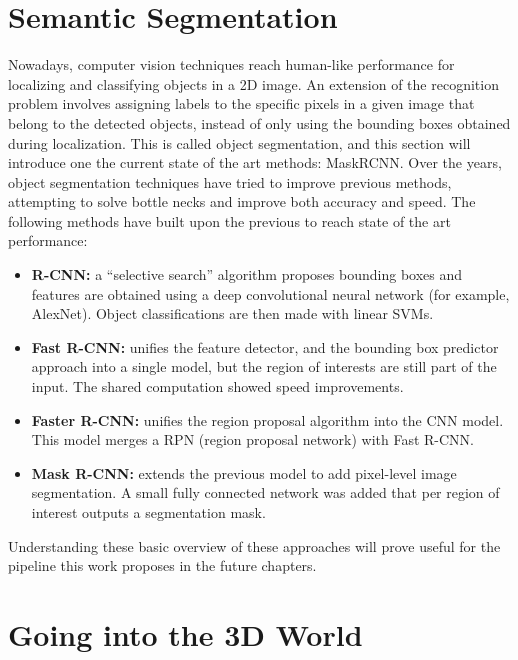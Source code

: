 \section{Semantic Segmentation}\label{chap:2:semantic-segmentation}
Nowadays, computer vision techniques reach human-like performance for localizing and classifying objects in a 2D image. An extension of the recognition problem involves assigning labels to the specific pixels in a given image that belong to the detected objects, instead of only using the bounding boxes obtained during localization. This is called object segmentation, and this section will introduce one the current state of the art methods: MaskRCNN.
Over the years, object segmentation techniques have tried to improve previous methods, attempting to solve bottle necks and improve both accuracy and speed. The following methods have built upon the previous to reach state of the art performance:
\begin{itemize}
    \item \textbf{R-CNN:} a “selective search” algorithm proposes bounding boxes and features are obtained using a deep convolutional neural network (for example, AlexNet). Object classifications are then made with linear SVMs.
    \item \textbf{Fast R-CNN:} unifies the feature detector, and the bounding box predictor approach into a single model, but the region of interests are still part of the input. The shared computation showed speed improvements.
    \item \textbf{Faster R-CNN:} unifies the region proposal algorithm into the CNN model. This model merges a RPN (region proposal network) with Fast R-CNN.
    \item \textbf{Mask R-CNN:} extends the previous model to add pixel-level image segmentation. A small fully connected network was added that per region of interest outputs a segmentation mask.
\end{itemize}

Understanding these basic overview of these approaches will prove useful for the pipeline this work proposes in the future chapters.
\section{Going into the 3D World}\label{chap:2:3d}

